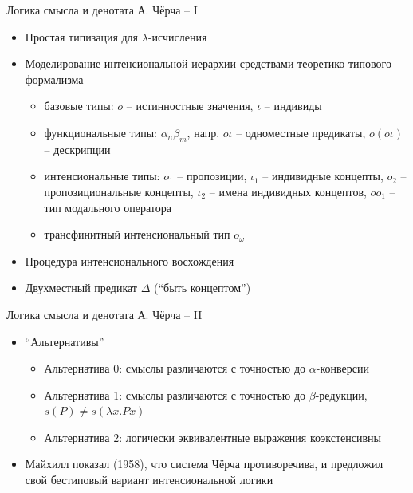 \documentclass{beamer}
\begin{document}
\begin{frame}{Логика смысла и денотата А. Чёрча -- I}

\begin{itemize}
    \item Простая типизация для $\lambda$-исчисления
    \medskip
    \item Моделирование интенсиональной иерархии средствами теоретико-типового формализма
   	\medskip
         \begin{itemize} 
	        \item базовые типы: $o$ -- истинностные значения, $\iota$ -- индивиды
	        \item функциональные типы: $\alpha_n \beta_m$, напр. $o \iota$ -- одноместные предикаты, $o(o \iota)$ -- дескрипции
	        \item интенсиональные типы: $o_1$ -- пропозиции, $\iota_1$ -- индивидные концепты, $o_2$ -- пропозициональные концепты, $\iota_2$ -- имена индивидных концептов, $oo_1$ -- тип модального оператора
	        \item трансфинитный интенсиональный тип $o_\omega$
	    \end{itemize}
	\medskip
	\item Процедура интенсионального восхождения
	\medskip
	\item Двухместный предикат $\Delta$ (``быть концептом'')
\end{itemize}
\end{frame}

\begin{frame}{Логика смысла и денотата А. Чёрча -- II}
\begin{itemize}
    \item ``Альтернативы''
    \medskip
        \begin{itemize}
            \item Альтернатива 0: смыслы различаются с точностью до $\alpha$-конверсии
            \item Альтернатива 1: смыслы различаются с точностью до $\beta$-редукции, $s(P) \neq s(\lambda x . Px)$
            \item Альтернатива 2: логически эквивалентные выражения коэкстенсивны        \end{itemize}
    \item Майхилл показал (1958), что система Чёрча противоречива, и предложил свой бестиповый вариант интенсиональной логики
\end{itemize}
\end{frame}
\end{document}
